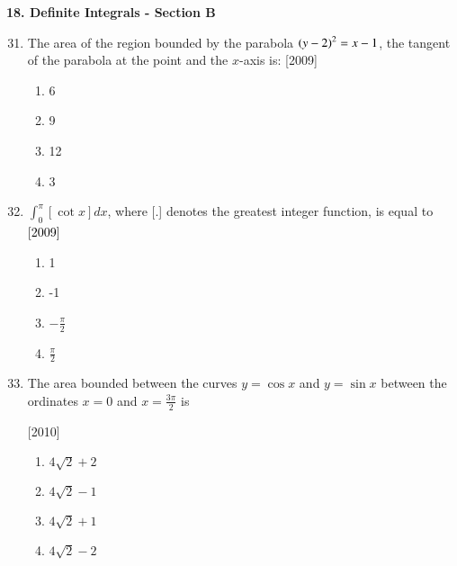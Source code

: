 \documentclass[journal,12pt,twocolumn]{IEEEtran}
\theoremstyle{remark}
\begin{document}
\maketitle\large{\textbf{18. Definite Integrals - Section B}}\small
\medskip
\begin{enumerate}[label=\textcolor{black}{\arabic*.}]
		\setcounter{enumi}{30}


	\item The area of the region bounded by the parabola $\left(y-2\right)^2=x-1$, the tangent of the parabola at the point  and the $x$-axis is:
		\hfill{[2009]}

		\begin{multicols}{4}
			\begin{enumerate}[label=(\alph*)]
				\item 6
				\item 9
				\item 12
				\item 3
			\end{enumerate}
		\end{multicols}
			
		
	\item $\int_0^\pi[\cot x]dx$, where [.] denotes the greatest integer function, is equal to
		\hfill{\textcolor{black}{[2009]}}

		\begin{multicols}{4}
			\begin{enumerate}[label=(\alph*)]
				\item 1
				\item -1
				\item $-\frac{\pi}{2}$
				\item $\frac{\pi}{2}$
			\end{enumerate}
		\end{multicols}


	\item The area bounded between the curves $y=\cos x$ and $y=\sin x$ between the ordinates $x=0$ and $x=\frac{3\pi}{2}$ is

		\hfill{[2010]}

		\begin{multicols}{2}
			\begin{enumerate}[label=(\alph*)]
				\item $4\sqrt{2}+2$
				\item $4\sqrt{2}-1$
				\item $4\sqrt{2}+1$
				\item $4\sqrt{2}-2$
			\end{enumerate}
		\end{multicols}


\end{enumerate}
\end{document}
